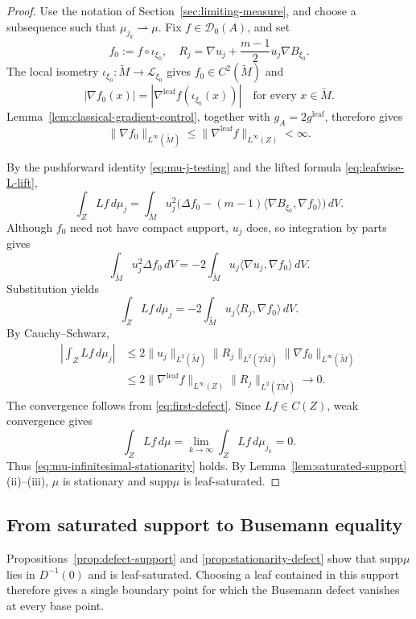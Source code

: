 \documentclass[12pt]{amsart}
\theoremstyle{definition}
\numberwithin{equation}{section}
\newcommand{\mc}{\mathcal}
\newcommand{\wti}{\widetilde}
\newcommand{\supp}{\mathrm{supp}}
\begin{document}
\begin{proof}
Use the notation of Section~\ref{sec:limiting-measure}, and choose a
subsequence such that \(\mu_{j_k}\rightharpoonup\mu\).  Fix
\(f\in\mc D_0(A)\), and set
\[
  f_0:=f\circ\iota_{\xi_0},
  \quad
  R_j=\nabla u_j+\frac{m-1}{2}u_j\nabla B_{\xi_0}.
\]
The local isometry
\(\iota_{\xi_0}\colon\wti M\to\mc L_{\xi_0}\) gives
\(f_0\in C^2(\wti M)\) and
\[
  |\nabla f_0(x)|
  =|\nabla^{\mathrm{leaf}}f(\iota_{\xi_0}(x))|
  \quad\text{for every }x\in\wti M.
\]
Lemma~\ref{lem:classical-gradient-control}, together with
\(g_A=2g^{\mathrm{leaf}}\), therefore gives
\[
  \|\nabla f_0\|_{L^\infty(\wti M)}
  \leq\|\nabla^{\mathrm{leaf}}f\|_{L^\infty(Z)}<\infty.
\]

By the pushforward identity \eqref{eq:mu-j-testing} and the lifted formula
\eqref{eq:leafwise-L-lift},
\[
  \int_ZLf\,d\mu_j
  =\int_{\wti M}u_j^2
   \bigl(\Delta f_0
   -(m-1)\langle\nabla B_{\xi_0},\nabla f_0\rangle\bigr)\,dV.
\]
Although \(f_0\) need not have compact support, \(u_j\) does, so integration
by parts gives
\[
  \int_{\wti M}u_j^2\Delta f_0\,dV
  =-2\int_{\wti M}u_j
       \langle\nabla u_j,\nabla f_0\rangle\,dV.
\]
Substitution yields
\begin{equation}\label{eq:first-defect-pairing}
  \int_ZLf\,d\mu_j
  =-2\int_{\wti M}u_j\langle R_j,\nabla f_0\rangle\,dV.
\end{equation}
By Cauchy--Schwarz,
\begin{align*}
  \left|\int_ZLf\,d\mu_j\right|
  &\leq2\|u_j\|_{L^2(\wti M)}
        \|R_j\|_{L^2(T\wti M)}
        \|\nabla f_0\|_{L^\infty(\wti M)}\\
  &\leq2\|\nabla^{\mathrm{leaf}}f\|_{L^\infty(Z)}
        \|R_j\|_{L^2(T\wti M)}
  \longrightarrow0.
\end{align*}
The convergence follows from \eqref{eq:first-defect}.  Since
\(Lf\in C(Z)\), weak convergence gives
\[
  \int_ZLf\,d\mu
  =\lim_{k\to\infty}\int_ZLf\,d\mu_{j_k}=0.
\]
Thus \eqref{eq:mu-infinitesimal-stationarity} holds.  By
Lemma~\ref{lem:saturated-support}\textup{(ii)}--\textup{(iii)},
\(\mu\) is stationary and \(\supp\mu\) is leaf-saturated.
\end{proof}

\subsection{From saturated support to Busemann equality}

Propositions~\ref{prop:defect-support} and
\ref{prop:stationarity-defect} show that \(\supp\mu\) lies in
\(D^{-1}(0)\) and is leaf-saturated.  Choosing a leaf contained in this
support therefore gives a single boundary point for which the Busemann
defect vanishes at every base point.
\end{document}
